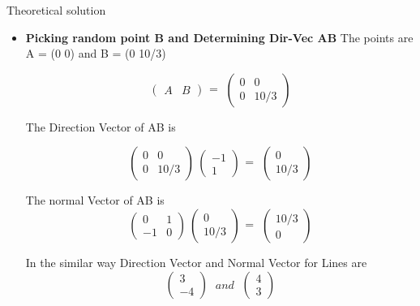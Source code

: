 \documentclass[11pt]{beamer}
\begin{document}
\begin{frame}{Theoretical solution}
\begin{itemize}
\item \textbf{Picking random point B and Determining Dir-Vec AB }
The points are A = (0  0) and B = (0  10/3) 
 
 \[\left(\begin{array}{cc}
 A & B
 \end{array}\right)
\begin{matrix}
=
\end{matrix}
\
%
\left(\begin{array}{cc}
0 & 0\\
0 & 10/3
\end{array}\right)
\]

The Direction Vector of AB is 
 
\[\left(\begin{array}{cc}
0 & 0\\
0 & 10/3
\end{array}\right)
\
%
\left(\begin{array}{cc}
-1\\
1
\end{array}\right)
%
\begin{matrix}
=
\end{matrix}
\
%
\left(\begin{array}{cc}
0\\
10/3

\end{array}\right)
\]

The normal Vector of AB is 
\[\left(\begin{array}{cc}
0 & 1\\
-1 & 0
\end{array}\right)
\
%
\left(\begin{array}{cc}
0\\
10/3
\end{array}\right)
%
\begin{matrix}
=
\end{matrix}
\
%
\left(\begin{array}{cc}
10/3\\
0

\end{array}\right)
\]

In the similar way Direction Vector and Normal Vector for Lines are 
\[\left(\begin{array}{cc}
3\\
-4
\end{array}\right)
\
%
\begin{matrix}
and
\end{matrix}
\
%
\left(\begin{array}{cc}
4\\ 
3
\end{array}\right)
\]

\end{itemize}
\end{frame}
\end{document}
